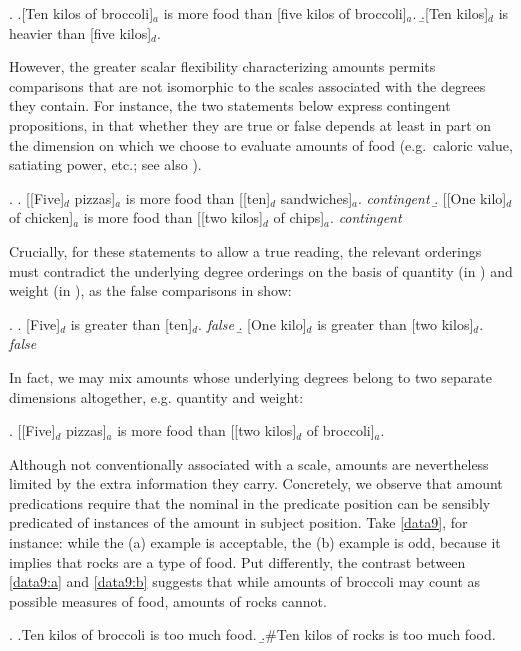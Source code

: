 \documentclass[a4paper,12pt,twoside]{article}
\begin{document}
	\ex.\label{data6} 
	\a.\label{data6:a}[Ten kilos of broccoli]$_a$ is more food than [five kilos of broccoli]$_a$.
	\b.\label{data6:b}[Ten kilos]$_d$ is heavier than [five kilos]$_d$.
	
	However, the greater scalar flexibility characterizing amounts permits comparisons that are not isomorphic to the scales associated with the degrees they contain. For instance, the two statements below express contingent propositions, in that whether they are true or false depends at least in part on the dimension on which we choose to evaluate amounts of food (e.g.\ caloric value, satiating power, etc.; see also \citealt{Mendia&Espinal:2024a}). 
	
	\ex.\label{contingent}
	\a. [[Five]$_d$ pizzas]$_a$ is more food than [[ten]$_d$ sandwiches]$_a$. \hfill \textit{contingent}
	\b. [[One kilo]$_d$ of chicken]$_a$ is more food than [[two kilos]$_d$ of chips]$_a$. \hfill \textit{contingent}
	
	Crucially, for these statements to allow a true reading, the relevant orderings must contradict the underlying degree orderings on the basis of quantity (in \Last[a]) and weight (in \Last[b]), as the false  comparisons in \Next show:
	
	\ex.\label{false}
	\a. [Five]$_d$ is greater than [ten]$_d$. \hfill \textit{false}
	\b. [One kilo]$_d$ is greater than [two kilos]$_d$. \hfill \textit{false}
	
	In fact, we may mix amounts whose underlying degrees belong to two separate dimensions altogether, e.g. quantity and weight:
	
	\ex. [[Five]$_d$ pizzas]$_a$ is more food than [[two kilos]$_d$ of broccoli]$_a$.
	
	Although not conventionally associated with a scale, amounts are nevertheless limited by the extra information they carry. Concretely, we observe that amount predications require that the nominal in the predicate position can be sensibly predicated of instances of the amount in subject position. Take \ref{data9}, for instance: while the (a) example is acceptable, the (b) example is odd, because it implies that rocks are a type of food. Put differently, the contrast between \ref{data9:a} and \ref{data9:b} suggests that while amounts of broccoli may count as possible measures of food, amounts of  rocks cannot.
	
	\ex.\label{data9} 
	\a.\label{data9:a}Ten kilos of broccoli is too much food.
	\b.\#\label{data9:b}Ten kilos of rocks is too much food.
	
\end{document}
